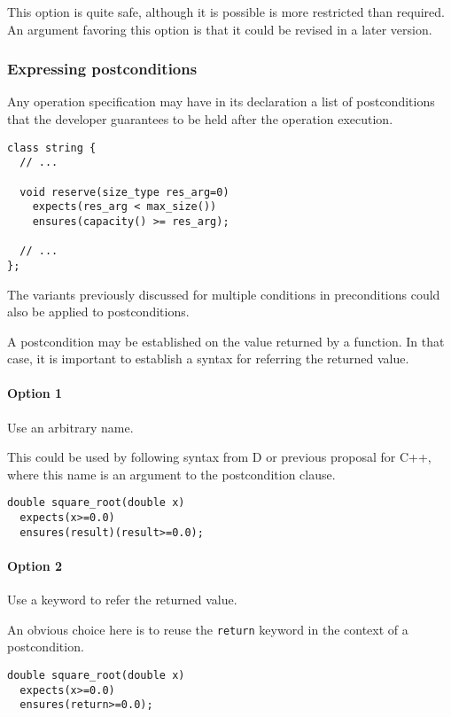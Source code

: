 This option is quite safe, although it is possible is more restricted than required.
An argument favoring this option is that it could be revised in a later version.

\subsubsection{Expressing postconditions}

Any operation specification may have in its declaration a list of postconditions
that the developer guarantees to be held after the operation execution.

\begin{lstlisting}
class string {
  // ...

  void reserve(size_type res_arg=0)
    expects(res_arg < max_size())
    ensures(capacity() >= res_arg);

  // ...
};
\end{lstlisting}

The variants previously discussed for multiple conditions in preconditions could
also be applied to postconditions.


A postcondition may be established on the value returned by a function. In that
case, it is important to establish a syntax for referring the returned value.

\paragraph{Option 1} Use an arbitrary name.

This could be used by following syntax from D or previous proposal for C++,
where this name is an argument to the postcondition clause.

\begin{lstlisting}
double square_root(double x)
  expects(x>=0.0)
  ensures(result)(result>=0.0);
\end{lstlisting}

\paragraph{Option 2} Use a keyword to refer the returned value.

An obvious choice here is to reuse the \texttt{return} keyword in the context of
a postcondition.

\begin{lstlisting}
double square_root(double x)
  expects(x>=0.0)
  ensures(return>=0.0);
\end{lstlisting}

